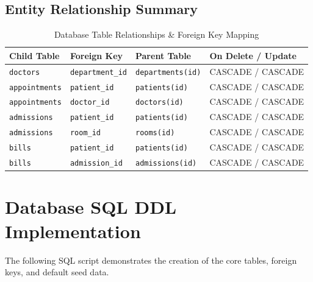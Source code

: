 \documentclass[12pt, a4paper]{article}
\begin{document}
\subsection{Entity Relationship Summary}
\begin{table}[h!]
\centering
\caption{Database Table Relationships \& Foreign Key Mapping}
\begin{tabular}{llll}
\toprule
\textbf{Child Table} & \textbf{Foreign Key} & \textbf{Parent Table} & \textbf{On Delete / Update} \\
\midrule
\texttt{doctors} & \texttt{department\_id} & \texttt{departments(id)} & CASCADE / CASCADE \\
\texttt{appointments} & \texttt{patient\_id} & \texttt{patients(id)} & CASCADE / CASCADE \\
\texttt{appointments} & \texttt{doctor\_id} & \texttt{doctors(id)} & CASCADE / CASCADE \\
\texttt{admissions} & \texttt{patient\_id} & \texttt{patients(id)} & CASCADE / CASCADE \\
\texttt{admissions} & \texttt{room\_id} & \texttt{rooms(id)} & CASCADE / CASCADE \\
\texttt{bills} & \texttt{patient\_id} & \texttt{patients(id)} & CASCADE / CASCADE \\
\texttt{bills} & \texttt{admission\_id} & \texttt{admissions(id)} & CASCADE / CASCADE \\
\bottomrule
\end{tabular}
\end{table}

\section{Database SQL DDL Implementation}
The following SQL script demonstrates the creation of the core tables, foreign keys, and default seed data.
\end{document}
